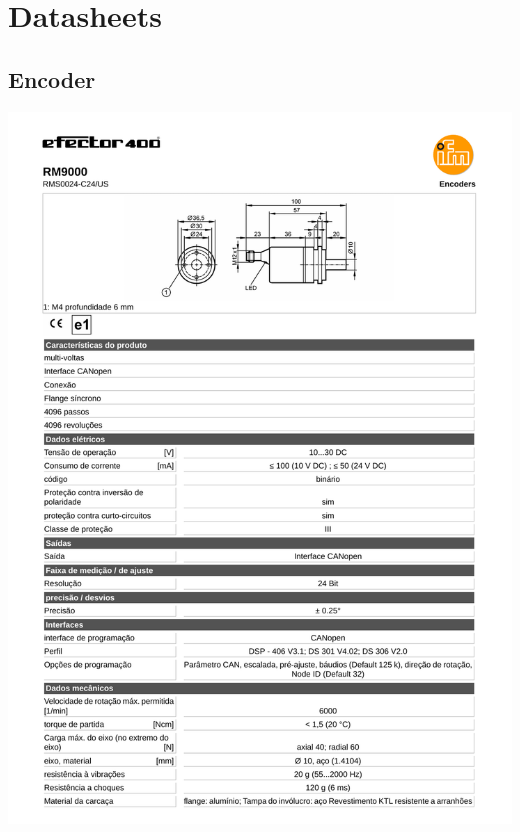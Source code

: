 



\section{Datasheets}
\subsection{Encoder}
\includegraphics[width=1\columnwidth]{figs/datasheets/rm9000.pdf}

